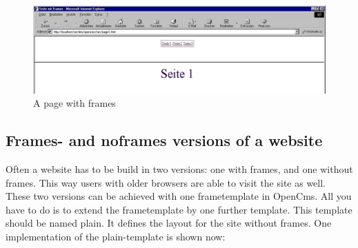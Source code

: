 \begin{figure}[hbt]
\begin{center}
\includegraphics[width=\sgw]
                   {pics/templateMech/frames_kurz}
\caption[A page with frames]
           {A page with frames}
\label{frames1}
\end{center}
\end{figure}

\subsection{Frames- and noframes versions of a website}

Often a website has to be build in two versions: one with frames,
and one without frames. This way users with older browsers are
able to visit the site as well. These two versions can be achieved
with one frametemplate in OpenCms. All you have to do is to extend
the frametemplate by one further template. This template should
be named {\name plain}. It defines the layout for the site without
frames. One implementation of the {\name plain}-template is shown now:

